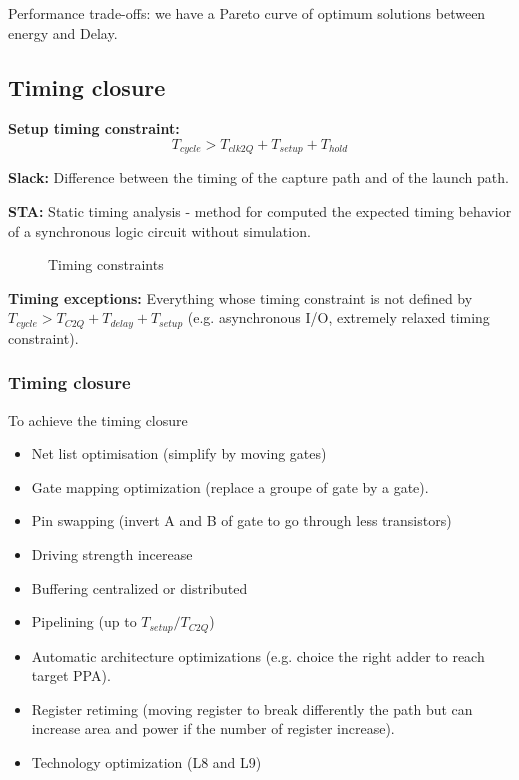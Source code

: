 Performance trade-offs: we have a Pareto curve of optimum solutions between energy and Delay.


\subsection{Timing closure}
\textbf{Setup timing constraint:}
\[
T_{cycle} > T_{clk2Q} + T_{setup} + T_{hold}
\]

\textbf{Slack:} Difference between the timing of the capture path and of the launch path.

\textbf{STA:} Static timing analysis - method for computed the expected timing behavior of a synchronous logic circuit without simulation.


\begin{figure}[!ht]
  \centering
  \caption{Timing constraints}
  \label{Tikz:}
  \end{figure}

  \textbf{Timing exceptions:} Everything whose timing constraint is not defined by \(T_{cycle} > T_{C2Q} + T_{delay} + T_{setup}\) (e.g. asynchronous I/O, extremely relaxed timing constraint).


  \subsubsection{Timing closure}
  To achieve the timing closure
  \begin{itemize}
    \item Net list optimisation (simplify by moving gates)
  \item Gate mapping optimization (replace a groupe of gate by a gate).
  \item Pin swapping (invert A and B of gate to go through less transistors)
  \item Driving strength incerease
  \item Buffering centralized or distributed
  \item Pipelining (up to \(T_{setup} / T_{C2Q}\))
  \item Automatic architecture optimizations (e.g. choice the right adder to reach target PPA).
  \item Register retiming (moving register to break differently the path but can increase area and power if the number of register increase).
  \item Technology optimization (L8 and L9)
  \end{itemize}
